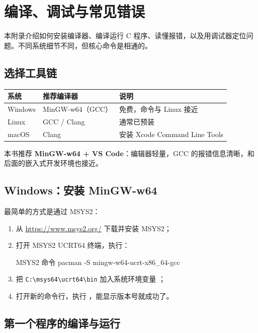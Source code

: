 \chapter{编译、调试与常见错误}
\label{app:toolchain}

本附录介绍如何安装编译器、编译运行 C 程序、读懂报错，以及用调试器定位问题。不同系统细节不同，但核心命令是相通的。

\section{选择工具链}

\begin{center}
\begin{tabular}{@{}lll@{}}
\toprule
系统 & 推荐编译器 & 说明 \\
\midrule
Windows & MinGW-w64（GCC） & 免费，命令与 Linux 接近 \\
Linux & GCC / Clang & 通常已预装 \\
macOS & Clang & 安装 Xcode Command Line Tools \\
\bottomrule
\end{tabular}
\end{center}

本书推荐 \textbf{MinGW-w64 + VS Code}：编辑器轻量，GCC 的报错信息清晰，和后面的嵌入式开发环境也接近。

\section{Windows：安装 MinGW-w64}

最简单的方式是通过 MSYS2：

\begin{enumerate}
  \item 从 \url{https://www.msys2.org/} 下载并安装 MSYS2；
  \item 打开 MSYS2 UCRT64 终端，执行：
\begin{outbox}{MSYS2 命令}
pacman -S mingw-w64-ucrt-x86_64-gcc
\end{outbox}
  \item 把 \texttt{C:\textbackslash msys64\textbackslash ucrt64\textbackslash bin} 加入系统环境变量 ；
  \item 打开新的命令行，执行 ，能显示版本号就成功了。
\end{enumerate}

\section{第一个程序的编译与运行}


